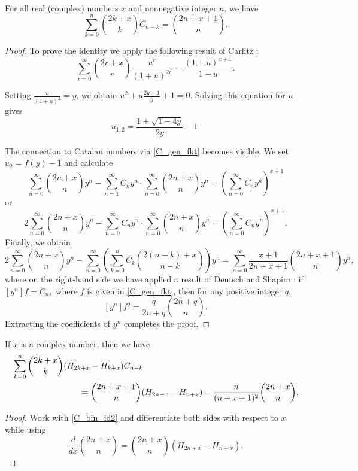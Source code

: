 \documentclass[12pt,reqno]{article}
\begin{document}
\begin{lemma}\label{lemma_Car}
	For all real (complex) numbers $x$ and nonnegative integer $n$, we have
	\begin{equation}\label{C_bin_id2}
	\sum_{k=0}^n \binom{2k+x}{k} C_{n-k} = \binom{2n+x+1}{n}.
	\end{equation}
\end{lemma}
\begin{proof}
	To prove the identity we apply the following result of Carlitz \cite[Equation (2.2)]{Carlitz}:
	$$\sum_{r=0}^\infty \binom{2r+x}{r}\frac{u^r}{(1+u)^{2r}} = \frac{(1+u)^{x+1}}{1-u}.$$

	Setting
	$\frac{u}{(1+u)^2} = y$, we obtain  $ u^2 + u \frac{2y-1}{y} + 1=0.$
	Solving this  equation for $u$ gives
	$$u_{1,2} = \frac{1 \pm \sqrt{1-4y}}{2y} - 1.$$

	The connection to Catalan numbers via \eqref{C_gen_fkt} becomes visible. We set $u_2 = f(y)-1$ and calculate
	$$\sum_{n=0}^\infty \binom{2n+x}{n} y^n - \sum_{n=1}^\infty C_n y^n\cdot \sum_{n=0}^\infty \binom{2n+x}{n} y^n 
	= \left (\sum_{n=0}^\infty C_n y^n \right )^{x+1}$$
	or
	$$
	2 \sum_{n=0}^\infty \binom{2n+x}{n} y^n - \sum_{n=0}^\infty C_n y^n \cdot\sum_{n=0}^\infty \binom{2n+x}{n} y^n 
	= \left (\sum_{n=0}^\infty C_n y^n \right )^{x+1}.$$
	Finally, we obtain
	$$2 \sum_{n=0}^\infty \binom{2n+x}{n} y^n - \sum_{n=0}^\infty \left ( \sum_{k=0}^n C_k \binom{2(n-k)+x}{n-k} \right ) y^n
	= \sum_{n=0}^\infty \frac{x+1}{2n+x+1} \binom{2n+x+1}{n} y^n,$$
	where on the right-hand side we have applied a result of Deutsch and Shapiro \cite{Deutsch}: if $[y^n] f=C_n,$ where $f$ is given 
	in \eqref{C_gen_fkt}, then for any positive integer $q$, $$[y^n]f^q=\frac{q}{2n+q}\binom{2n+q}{n}.$$ 
	Extracting the coefficients of $y^n$
	completes the proof.
\end{proof}
\begin{theorem}
If $x$ is a complex number, then we have
\begin{align}
	&\sum_{k=0}^n \binom{2k+x}{k} (H_{2k+x} - H_{k+x}) C_{n-k} \notag\\
&\qquad\qquad\qquad\qquad =  \binom{2n+x+1}{n} (H_{2n+x} - H_{n+x}) - \frac{n}{(n+x+1)^2} \binom{2n+x}{n}.\label{CH_bin_id2}
\end{align}
\end{theorem}
\begin{proof}
	Work with \eqref{C_bin_id2} and differentiate both sides with respect to $x$ while using
	\begin{equation*}
	\frac{d}{dx} \binom{2n+x}{n} = \binom{2n+x}{n} (H_{2n+x} - H_{n+x} ).
	\end{equation*}
\end{proof}
\end{document}
